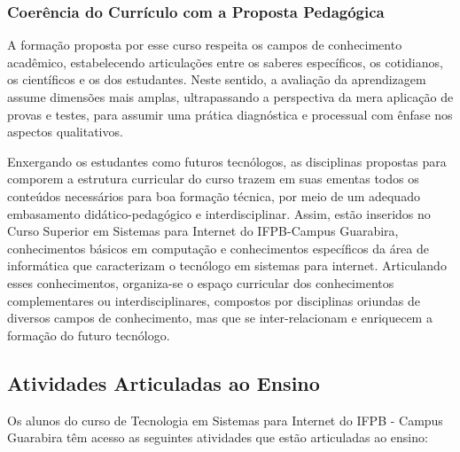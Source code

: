 \subsubsection{Coerência do Currículo com a Proposta Pedagógica}

A formação proposta por esse curso respeita os campos de conhecimento acadêmico, estabelecendo articulações entre os saberes específicos, os cotidianos, os científicos e os dos estudantes.  Neste sentido, a avaliação da aprendizagem assume dimensões mais amplas, ultrapassando a perspectiva da mera aplicação de provas e testes, para assumir uma prática diagnóstica e processual com ênfase nos aspectos qualitativos.

Enxergando os estudantes como futuros tecnólogos, as disciplinas propostas para comporem a estrutura curricular do curso trazem em suas ementas todos os conteúdos necessários para boa formação técnica, por meio de um adequado embasamento didático-pedagógico e interdisciplinar. Assim, estão inseridos no Curso Superior em Sistemas para Internet do IFPB-Campus Guarabira, conhecimentos básicos em computação e conhecimentos específicos da área de informática que caracterizam o tecnólogo em sistemas para internet. Articulando esses conhecimentos, organiza-se o espaço curricular dos conhecimentos complementares ou interdisciplinares, compostos por disciplinas oriundas de diversos campos de conhecimento, mas que se inter-relacionam e enriquecem a formação do futuro tecnólogo.

\subsection{Atividades Articuladas ao Ensino}

 Os alunos do curso de Tecnologia em Sistemas para Internet do IFPB - Campus Guarabira têm acesso as seguintes atividades que estão articuladas ao ensino:


